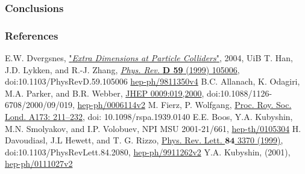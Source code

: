 \documentclass[10pt]{beamer}
\begin{document}
	\begin{frame}
		\frametitle{Conclusions}
	\end{frame}
	
	\begin{frame}
		\frametitle{References}
		\begin{thebibliography}{9}
			E.W. Dvergsnes, \href{http://bora.uib.no/bitstream/handle/1956/847/THESIS.pdf?sequence=1}{"\emph{Extra Dimensions at Particle Colliders}"}, 2004, UiB
			T. Han, J.D. Lykken, and R.-J. Zhang,
			\href{http://journals.aps.org/prd/abstract/10.1103/PhysRevD.59.105006}{\emph{Phys. Rev.} {\bfseries D 59} (1999) 105006}, doi:10.1103/PhysRevD.59.105006 \href{http://xxx.lanl.gov/abs/hep-ph/9811350v4}{hep-ph/9811350v4}
			B.C. Allanach, K. Odagiri, M.A. Parker, and B.R. Webber,
			\href{http://iopscience.iop.org/article/10.1088/1126-6708/2000/09/019/meta;jsessionid=8B906F8B155A00E75050CBB02B18326C.c4.iopscience.cld.iop.org}{JHEP 0009:019,2000}, doi:10.1088/1126-6708/2000/09/019, \href{http://arxiv.org/abs/hep-ph/0006114v2}{hep-ph/0006114v2}
			M. Fierz, P. Wolfgang, \href{http://rspa.royalsocietypublishing.org/content/173/953/211}{Proc. Roy. Soc. Lond. A173: 211–232}, doi: 10.1098/rspa.1939.0140
			E.E. Boos, Y.A. Kubyshin, M.N. Smolyakov, and I.P. Volobuev, NPI MSU 2001-21/661, \href{http://arxiv.org/abs/hep-th/0105304}{hep-th/0105304}
			H. Davoudiasl, J.L Hewett, and T. G. Rizzo, \href{http://journals.aps.org/prl/abstract/10.1103/PhysRevLett.84.2080}{Phys. Rev. Lett. $\bm{84}$ 3370 (1999)}, doi:10.1103/PhysRevLett.84.2080, \href{http://arxiv.org/pdf/hep-ph/9911262v2.pdf}{hep-ph/9911262v2}
			Y.A. Kubyshin, (2001), \href{http://arxiv.org/abs/hep-ph/0111027v2}{hep-ph/0111027v2}
		\end{thebibliography}
	\end{frame}
\end{document}
